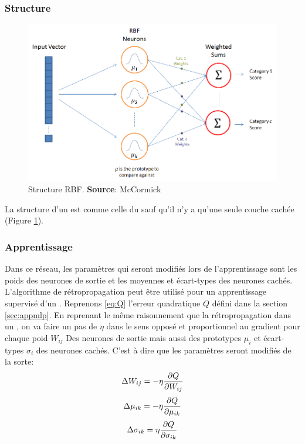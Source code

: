 \subsubsection{Structure}
\begin{figure}
 \centering
 \includegraphics[scale=0.5]{../figures/RBFstruct.png}
 \caption{Structure RBF. \textbf{Source}: McCormick\cite{RBFtuto}}
 \label{structurerbf}
\end{figure}
La structure d'un \rbf est comme celle du \mlp sauf qu'il n'y a qu'une seule couche cachée (Figure \ref{structurerbf}).
\subsubsection{Apprentissage}
Dans ce réseau, les paramètres qui seront modifiés lors de l'apprentissage sont les poids des neurones de sortie et les moyennes et écart-types des neurones cachés.
L'algorithme de rétropropagation peut être utilisé pour un apprentissage supervisé d'un \rbf.
Reprenons \eqref{eq:Q} l'erreur quadratique $Q$ défini dans la section \ref{sec:appmlp}.
En reprenant le même raisonnement que la rétropropagation dans un \mlp,
on va faire un pas de $\eta$ dans le sens opposé et proportionnel au gradient pour chaque poid $W_{ij}$ Des neurones de sortie mais aussi des prototypes $\mu_i$ et écart-types $\sigma_i$ des neurones cachés.
C'est à dire que les paramètres seront modifiés de la sorte:
\begin{equation}\label{eq:modifpoid}
 \Delta W_{ij} = -\eta \frac{\partial Q}{\partial W_{ij}}
\end{equation}
\begin{equation}\label{eq:modifmu}
 \Delta \mu_{ik} = -\eta \frac{\partial Q}{\partial \mu_{ik}}
\end{equation}
\begin{equation}\label{eq:modifsigma}
 \Delta \sigma_{ik} = \eta \frac{\partial Q}{\partial \sigma_{ik}}
\end{equation}

